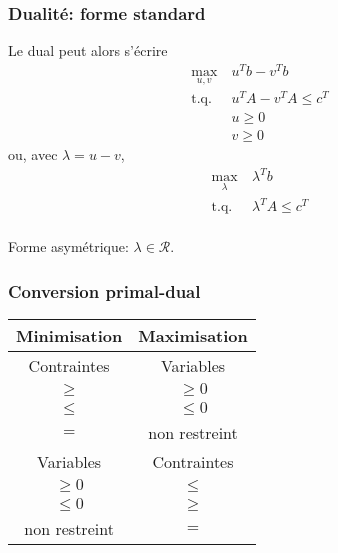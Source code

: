 \documentclass[usepdftitle=false]{beamer}
\def\cR{\mathcal{R}}
\begin{document}
\begin{frame}
\frametitle{Dualité: forme standard}

Le dual peut alors s'écrire
\begin{align*}
\max_{u, v} \ & u^T b - v^T b \\
\mbox{t.q. } & u^T A - v^T A \leq c^T \\
& u \geq 0 \\
& v \geq 0
\end{align*}
ou, avec $\lambda = u - v$,
\begin{align*}
\max_{\lambda} \ & \lambda^T b \\
\mbox{t.q. } & \lambda^T A \leq c^T \\
\end{align*}

Forme asymétrique: $\lambda \in \cR$.

\end{frame}

\begin{frame}
\frametitle{Conversion primal-dual}

\begin{center}
\begin{tabular}{|c|c|}
\hline
\hline
{\bf Minimisation} & {\bf Maximisation} \\
\hline
\hline
Contraintes & Variables \\
$\geq$ & $\geq 0$ \\
$\leq$ & $\leq 0$ \\
$=$ & non restreint \\
\hline
Variables & Contraintes \\
\hline
$\geq 0$ & $\leq$ \\
$\leq 0$ & $\geq$ \\
non restreint & $=$ \\
\hline
\end{tabular}
\end{center}

\end{frame}
\end{document}
